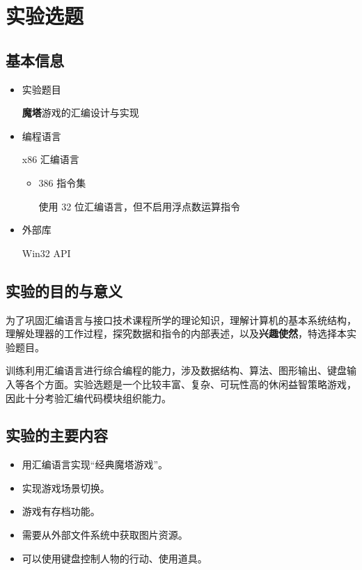 \chapter{实验选题}

\section{基本信息}

\begin{itemize}
    \item 实验题目
    
    \textbf{魔塔}游戏的汇编设计与实现
    
    \item 编程语言
    
    x86 汇编语言
    
    \begin{itemize}
        \item 386 指令集
        
        使用 32 位汇编语言，但不启用浮点数运算指令
        
    \end{itemize}
    
    \item 外部库
    
    Win32 API
    
\end{itemize}

\section{实验的目的与意义}

为了巩固汇编语言与接口技术课程所学的理论知识，理解计算机的基本系统结构，理解处理器的工作过程，探究数据和指令的内部表述，以及\textbf{兴趣使然}，特选择本实验题目。

训练利用汇编语言进行综合编程的能力，涉及数据结构、算法、图形输出、键盘输入等各个方面。实验选题是一个比较丰富、复杂、可玩性高的休闲益智策略游戏，因此十分考验汇编代码模块组织能力。

\section{实验的主要内容}

\begin{itemize}
    \item 用汇编语言实现“经典魔塔游戏”。
    \item 实现游戏场景切换。
    \item 游戏有存档功能。
    \item 需要从外部文件系统中获取图片资源。
    \item 可以使用键盘控制人物的行动、使用道具。
\end{itemize}

